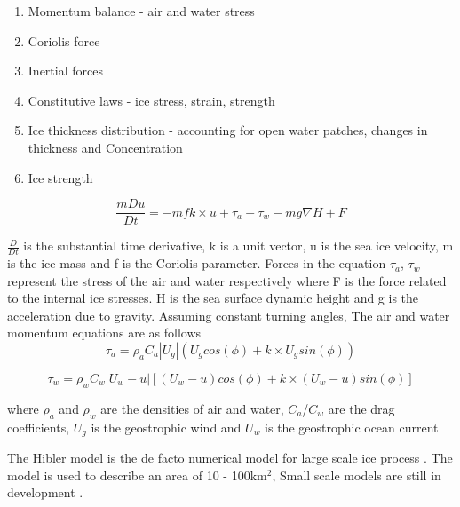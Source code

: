 \begin{enumerate}
	\item    Momentum balance  - air and water stress
	\item    Coriolis force
	\item    Inertial forces
	\item    Constitutive laws - ice stress, strain, strength
	\item    Ice thickness distribution - accounting for open water patches, changes in thickness and Concentration
	\item    Ice strength 
\end{enumerate}
\begin{equation}
	\frac{mDu}{Dt} = -mfk\times u +\tau_a +\tau_w -mg \nabla H +F 
\end{equation}

$\frac{D}{Dt}$ is the substantial time derivative, k is a unit vector, u is the sea ice velocity, m is the ice mass and f is the Coriolis parameter. Forces in the equation $\tau_a$, $\tau_w$ represent the stress of the air and water respectively where F is the force related to the internal ice stresses. H is the sea surface dynamic height and g is the acceleration due to gravity. Assuming constant turning angles, The air and water momentum equations are as follows
\begin{equation}
	\tau_a = \rho_a C_a|U_g|(U_g cos(\phi)+k\times U_g sin(\phi))
\end{equation}

\begin{equation}
	\tau_w = \rho_w C_w|U_w-u|[(U_w-u)cos(\phi)+k\times(U_w-u)sin(\phi)]
\end{equation}


where $\rho_a $ and $\rho_w$ are the densities of air and water, $C_a$/$C_w$ are the drag coefficients, $U_g$ is the geostrophic wind and $U_w$ is the geostrophic ocean current\par

The Hibler model is the de facto numerical model for large scale ice process \cite{Rutgher2019SmallScale}. The model is used to describe an area of 10 - 100km$^2$, Small scale models are still in development \cite{Rutgher2019SmallScale}.\par 

